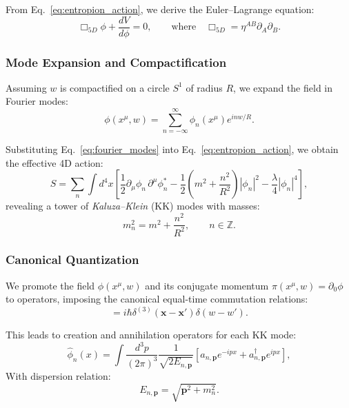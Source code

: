\documentclass[12pt]{article}
\begin{document}
From Eq.~\eqref{eq:entropion_action}, we derive the Euler–Lagrange equation:
\begin{equation}
\Box_{5D} \phi + \frac{dV}{d\phi} = 0, \qquad \text{where} \quad \Box_{5D} = \eta^{AB} \partial_A \partial_B.
\label{eq:entropion_eom}
\end{equation}

\subsubsection*{Mode Expansion and Compactification}

Assuming \( w \) is compactified on a circle \( S^1 \) of radius \( R \), we expand the field in Fourier modes:
\begin{equation}
\phi(x^\mu, w) = \sum_{n=-\infty}^{\infty} \phi_n(x^\mu) e^{i n w / R}.
\label{eq:fourier_modes}
\end{equation}

Substituting Eq.~\eqref{eq:fourier_modes} into Eq.~\eqref{eq:entropion_action}, we obtain the effective 4D action:
\begin{equation}
S = \sum_n \int d^4x \left[ \frac{1}{2} \partial_\mu \phi_n \, \partial^\mu \phi_n^* - \frac{1}{2} \left( m^2 + \frac{n^2}{R^2} \right) |\phi_n|^2 - \frac{\lambda}{4} |\phi_n|^4 \right],
\label{eq:kk_reduction}
\end{equation}
revealing a tower of \emph{Kaluza–Klein} (KK) modes with masses:
\begin{equation}
m_n^2 = m^2 + \frac{n^2}{R^2}, \qquad n \in \mathbb{Z}.
\label{eq:kk_masses}
\end{equation}

\subsubsection*{Canonical Quantization}

We promote the field \( \phi(x^\mu, w) \) and its conjugate momentum \( \pi(x^\mu, w) = \partial_0 \phi \) to operators, imposing the canonical equal-time commutation relations:
\begin{equation}
[\hat{\phi}(x, w), \hat{\pi}(x', w')] = i \hbar \delta^{(3)}(\mathbf{x} - \mathbf{x}') \delta(w - w').
\label{eq:canonical_commutation}
\end{equation}

This leads to creation and annihilation operators for each KK mode:
\begin{equation}
\hat{\phi}_n(x) = \int \frac{d^3p}{(2\pi)^3} \frac{1}{\sqrt{2E_{n, \mathbf{p}}}} \left[ a_{n,\mathbf{p}} e^{-ipx} + a^\dagger_{n,\mathbf{p}} e^{ipx} \right],
\label{eq:mode_quantization}
\end{equation}
With dispersion relation:
\begin{equation}
E_{n, \mathbf{p}} = \sqrt{\mathbf{p}^2 + m_n^2}.
\end{equation}
\end{document}
